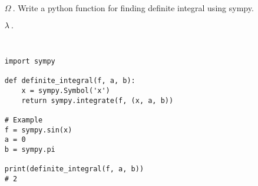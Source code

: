 \documentclass{article}
\begin{document}
\ttfamily
\sloppy
\vspace*{\fill}
\begin{itemize}
	\item[\textcolor{REDD}{$\Omega ~.$}]\textcolor{REDD}{Write a python function for finding definite integral using sympy.}

	\item[\textcolor{black}{$\lambda ~.$}]
\begin{verbatim}


import sympy

def definite_integral(f, a, b):
    x = sympy.Symbol('x')
    return sympy.integrate(f, (x, a, b))

# Example
f = sympy.sin(x)
a = 0
b = sympy.pi

print(definite_integral(f, a, b))
# 2
\end{verbatim}
\end{itemize}
\vspace*{\fill}
\end{document}
